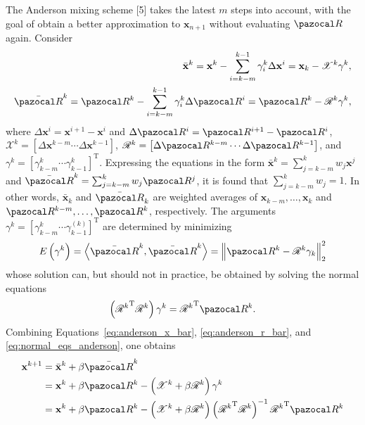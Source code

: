 The Anderson mixing scheme [5] takes the latest \(m\) steps into account, with the goal of obtain a better approximation to \(\mathbf x_{n+1}\) without evaluating \(\pazocal R\) again.
Consider
\begin{align}
  \bar{\mathbf x}^{k}=\mathbf x^{k}-\sum_{i=k-m}^{k-1} \gamma_{i}^{k} \Delta \mathbf x^{i}=\mathbf x_{k}-\mathscr{X}^{k} \gamma^{k}, \label{eq:anderson_x_bar}\\
  \bar{\pazocal R}^{k}=\pazocal R^{k}-\sum_{i=k-m}^{k-1} \gamma_{i}^{k} \Delta \pazocal R^{i}=\pazocal R^{k}-\mathscr{R}^{k} \gamma^{k} \label{eq:anderson_r_bar},
\end{align}
where \(\Delta \mathbf x^{i}=\mathbf x^{i+1}-\mathbf x^{i}\) and \(\Delta \pazocal R^{i}=\pazocal R^{i+1}-\pazocal R^{i}\), \(\mathscr{X}^{k}=\left[\Delta \mathbf x^{k-m} \cdots \Delta \mathbf x^{k-1}\right]\), \(\mathscr{R}^{k}=\left[\Delta \pazocal R^{k-m} \cdots \Delta \pazocal R^{k-1}\right]\), and \(\gamma^{k}=\left[\gamma_{k-m}^{k} \cdots \gamma_{k-1}^{k}\right]^{\mathrm{T}}\).
Expressing the equations in the form \(\bar{\mathbf x}^{k}=\sum_{j=k-m}^{k} w_{j} \mathbf x^{j}\) and \(\bar{\pazocal R}^{k}=\sum_{j=k-m}^{k} w_{j} \pazocal R^{j}\), it is found that \(\sum_{j=k-m}^{k} w_{j}=1\).
In other words, \(\bar{\mathbf x}_{k}\) and \(\bar{\pazocal R}_{k}\) are weighted averages of \(\mathbf x_{k-m}, \ldots, \mathbf x_{k}\) and \(\pazocal R^{k-m}, \ldots, \pazocal R^{k}\), respectively.
The arguments \(\gamma^{k}=\left[\gamma_{k-m}^{k} \cdots \gamma_{k-1}^{(k)}\right]^{\mathrm{T}}\) are determined by minimizing
\begin{equation}
E\left(\gamma^{k}\right)=\left\langle\bar{\pazocal R}^{k}, \bar{\pazocal R}^{k}\right\rangle=\left\|\pazocal R^{k}-\mathscr{R}^{k} \gamma_{k}\right\|_{2}^{2}
\end{equation}
whose solution can, but should not in practice, be obtained by solving the normal equations
\begin{equation}
\left({\mathscr{R}^{k}}^{\mathrm{T}} \mathscr{R}^{k}\right) \gamma^{k}={\mathscr{R}^{k}}^{\mathrm{T}} \pazocal R^{k}. \label{eq:normal_eqs_anderson}
\end{equation}
Combining Equations~\eqref{eq:anderson_x_bar}, \eqref{eq:anderson_r_bar}, and \eqref{eq:normal_eqs_anderson}, one obtains
\begin{align}
\mathbf x^{k+1} &=\bar{\mathbf x}^{k}+\beta \bar{\pazocal R}^{k} \\
&=\mathbf x^{k}+\beta \pazocal R^{k}-\left(\mathscr{X}^{k}+\beta \mathscr{R}^{k}\right) \gamma^{k} \\
&=\mathbf x^{k}+\beta \pazocal R^{k}-\left(\mathscr{X}^{k}+\beta \mathscr{R}^{k}\right)\left({\mathscr{R}^{k}}^{\mathrm{T}} \mathscr{R}^{k}\right)^{-1} {\mathscr{R}^{k}}^{\mathrm{T}} \pazocal R^{k} \label{eq:update_anderson_mixing}
\end{align}
